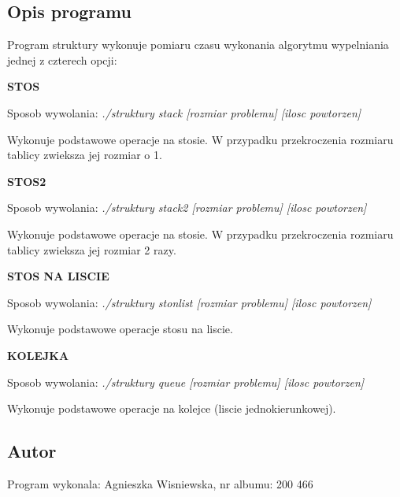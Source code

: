 \hypertarget{index_opis}{}\subsection{Opis programu}\label{index_opis}
Program struktury wykonuje pomiaru czasu wykonania algorytmu wypelniania jednej z czterech opcji\-: \par
\par
 {\bfseries S\-T\-O\-S}\par
 Sposob wywolania\-: {\itshape {\ttfamily ./struktury stack \mbox{[}rozmiar problemu\mbox{]} \mbox{[}ilosc powtorzen\mbox{]}}}\par
 Wykonuje podstawowe operacje na stosie. W przypadku przekroczenia rozmiaru tablicy zwieksza jej rozmiar o 1.\par


{\bfseries S\-T\-O\-S2}\par
 Sposob wywolania\-: {\itshape {\ttfamily ./struktury stack2 \mbox{[}rozmiar problemu\mbox{]} \mbox{[}ilosc powtorzen\mbox{]}}}\par
 Wykonuje podstawowe operacje na stosie. W przypadku przekroczenia rozmiaru tablicy zwieksza jej rozmiar 2 razy.\par


{\bfseries S\-T\-O\-S N\-A L\-I\-S\-C\-I\-E}\par
 Sposob wywolania\-: {\itshape {\ttfamily ./struktury stonlist \mbox{[}rozmiar problemu\mbox{]} \mbox{[}ilosc powtorzen\mbox{]}}}\par
 Wykonuje podstawowe operacje stosu na liscie.\par


{\bfseries K\-O\-L\-E\-J\-K\-A}\par
 Sposob wywolania\-: {\itshape {\ttfamily ./struktury queue \mbox{[}rozmiar problemu\mbox{]} \mbox{[}ilosc powtorzen\mbox{]}}}\par
 Wykonuje podstawowe operacje na kolejce (liscie jednokierunkowej).\par
\par
\hypertarget{index_autor}{}\subsection{Autor}\label{index_autor}
Program wykonala\-: Agnieszka Wisniewska, nr albumu\-: 200 466 